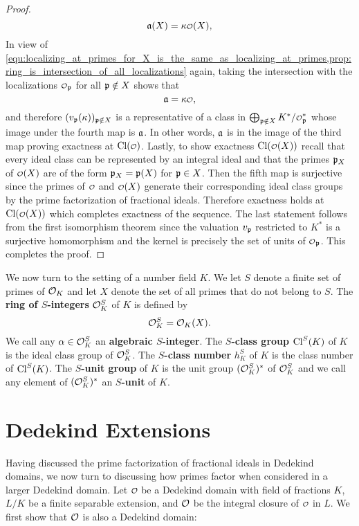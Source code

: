 \begin{proof}
      \[
        \mf{a}(X) = \k\smc{O}(X),
      \]
      In view of \cref{equ:localizing_at_primes_for_X_is_the_same_as_localizing_at_primes,prop:ring_is_intersection_of_all_localizations} again, taking the intersection with the localizations $\smc{O}_{\mf{p}}$ for all $\mathfrak{p} \notin X$ shows that
      \[
        \mf{a} = \k\smc{O},
      \]
      and therefore $(v_{\mathfrak{p}}(\kappa))_{\mathfrak{p} \notin X}$ is a representative of a class in $\bigoplus_{\mf{p} \notin X}K^{\ast}/\smc{O}_{\mf{p}}^{\ast}$ whose image under the fourth map is $\mathfrak{a}$. In other words, $\mathfrak{a}$ is in the image of the third map proving exactness at $\Cl(\smc{O})$. Lastly, to show exactness $\Cl(\smc{O}(X))$ recall that every ideal class can be represented by an integral ideal and that the primes $\mathfrak{p}_{X}$ of $\smc{O}(X)$ are of the form $\mathfrak{p}_{X} = \mathfrak{p}(X)$ for $\mathfrak{p} \in X$. Then the fifth map is surjective since the primes of $\smc{O}$ and $\smc{O}(X)$ generate their corresponding ideal class groups by the prime factorization of fractional ideals. Therefore exactness holds at $\Cl(\smc{O}(X))$ which completes exactness of the sequence. The last statement follows from the first isomorphism theorem since the valuation $v_{\mathfrak{p}}$ restricted to $K^{\ast}$ is a surjective homomorphism and the kernel is precisely the set of units of $\smc{O}_{\mf{p}}$. This completes the proof.
    \end{proof}

    We now turn to the setting of a number field $K$. We let $S$ denote a finite set of primes of $\mathcal{O}_{K}$ and let $X$ denote the set of all primes that do not belong to $S$. The \textbf{ring of $S$-integers} $\mathcal{O}_{K}^{S}$ of $K$ is defined by
    \[
      \mathcal{O}_{K}^{S} = \mathcal{O}_{K}(X).
    \]
    We call any $\alpha \in \mathcal{O}_{K}^{S}$ an \textbf{algebraic $S$-integer}. The \textbf{$S$-class group} $\operatorname{\mathrm{Cl}}^{S}(K)$ of $K$ is the ideal class group of $\mathcal{O}_{K}^{S}$. The \textbf{$S$-class number} $h_{K}^{S}$ of $K$ is the class number of $\operatorname{\mathrm{Cl}}^{S}(K)$. The \textbf{$S$-unit group} of $K$ is the unit group $(\mathcal{O}_{K}^{S})^{\ast}$ of $\mathcal{O}_{K}^{S}$ and we call any element of $(\mathcal{O}_{K}^{S})^{\ast}$ an \textbf{$S$-unit} of $K$.
  \section{Dedekind Extensions}
    Having discussed the prime factorization of fractional ideals in Dedekind domains, we now turn to discussing how primes factor when considered in a larger Dedekind domain. Let $\smc{O}$ be a Dedekind domain with field of fractions $K$, $L/K$ be a finite separable extension, and $\mathcal{O}$ be the integral closure of $\smc{O}$ in $L$. We first show that $\mathcal{O}$ is also a Dedekind domain:

